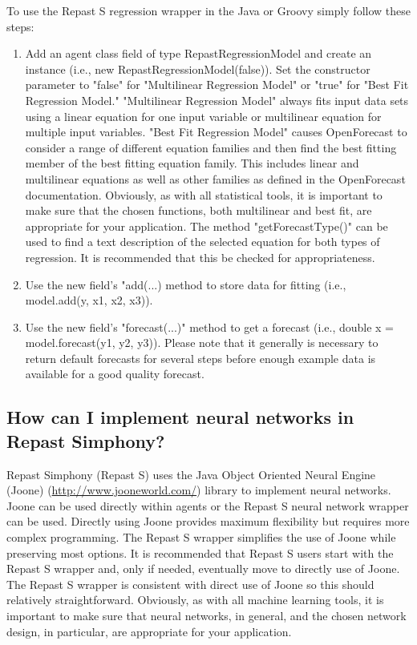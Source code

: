 \documentclass[11pt]{article}
\begin{document}
To use the Repast S regression wrapper in the Java or Groovy simply follow these steps:
\begin{enumerate}
\item Add an agent class field of type RepastRegressionModel and create an instance (i.e., new RepastRegressionModel(false)). Set the constructor parameter to "false" for "Multilinear Regression Model" or "true" for "Best Fit Regression Model." "Multilinear Regression Model" always fits input data sets using a linear equation for one input variable or multilinear equation for multiple input variables. "Best Fit Regression Model" causes OpenForecast to consider a range of different equation families and then find the best fitting member of the best fitting equation family. This includes linear and multilinear equations as well as other families as defined in the OpenForecast documentation. Obviously, as with all statistical tools, it is important to make sure that the chosen functions, both multilinear and best fit, are appropriate for your application. The method "getForecastType()" can be used to find a text description of the selected equation for both types of regression. It is recommended that this be checked for appropriateness.
\item Use the new field's "add(...) method to store data for fitting (i.e., model.add(y, x1, x2, x3)).
\item Use the new field's "forecast(...)" method to get a forecast (i.e., double x = model.forecast(y1, y2, y3)). Please note that it generally is necessary to return default forecasts for several steps before enough example data is available for a good quality forecast.
\end{enumerate}

\subsection{How can I implement neural networks in Repast Simphony?}
\label{prs:neural_network}

Repast Simphony (Repast S) uses the Java Object Oriented Neural Engine (Joone) (\url{http://www.jooneworld.com/}) library to implement neural networks. Joone can be used directly within agents or the Repast S neural network wrapper can be used. Directly using Joone provides maximum flexibility but requires more complex programming. The Repast S wrapper simplifies the use of Joone while preserving most options. It is recommended that Repast S users start with the Repast S wrapper and, only if needed, eventually move to directly use of Joone. The Repast S wrapper is consistent with direct use of Joone so this should relatively straightforward. Obviously, as with all machine learning tools, it is important to make sure that neural networks, in general, and the chosen network design, in particular, are appropriate for your application.
\end{document}
